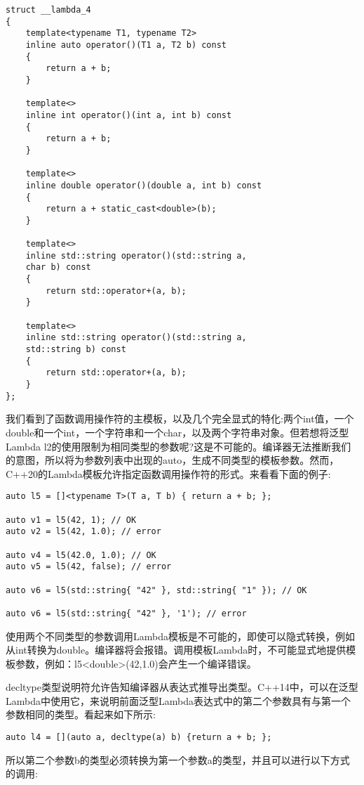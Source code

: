 \begin{lstlisting}[style=styleCXX]
struct __lambda_4
{
	template<typename T1, typename T2>
	inline auto operator()(T1 a, T2 b) const
	{
		return a + b;
	}

	template<>
	inline int operator()(int a, int b) const
	{
		return a + b;
	}

	template<>
	inline double operator()(double a, int b) const
	{
		return a + static_cast<double>(b);
	}

	template<>
	inline std::string operator()(std::string a,
	char b) const
	{
		return std::operator+(a, b);
	}

	template<>
	inline std::string operator()(std::string a,
	std::string b) const
	{
		return std::operator+(a, b);
	}
};
\end{lstlisting}

我们看到了函数调用操作符的主模板，以及几个完全显式的特化:两个int值，一个double和一个int，一个字符串和一个char，以及两个字符串对象。但若想将泛型Lambda l2的使用限制为相同类型的参数呢?这是不可能的。编译器无法推断我们的意图，所以将为参数列表中出现的auto，生成不同类型的模板参数。然而，C++20的Lambda模板允许指定函数调用操作符的形式。来看看下面的例子:

\begin{lstlisting}[style=styleCXX]
auto l5 = []<typename T>(T a, T b) { return a + b; };

auto v1 = l5(42, 1); // OK
auto v2 = l5(42, 1.0); // error

auto v4 = l5(42.0, 1.0); // OK
auto v5 = l5(42, false); // error

auto v6 = l5(std::string{ "42" }, std::string{ "1" }); // OK

auto v6 = l5(std::string{ "42" }, '1'); // error
\end{lstlisting}

使用两个不同类型的参数调用Lambda模板是不可能的，即使可以隐式转换，例如从int转换为double。编译器将会报错。调用模板Lambda时，不可能显式地提供模板参数，例如：l5<double>(42,1.0)会产生一个编译错误。

decltype类型说明符允许告知编译器从表达式推导出类型。C++14中，可以在泛型Lambda中使用它，来说明前面泛型Lambda表达式中的第二个参数具有与第一个参数相同的类型。看起来如下所示:

\begin{lstlisting}[style=styleCXX]
auto l4 = [](auto a, decltype(a) b) {return a + b; };
\end{lstlisting}

所以第二个参数b的类型必须转换为第一个参数a的类型，并且可以进行以下方式的调用:

